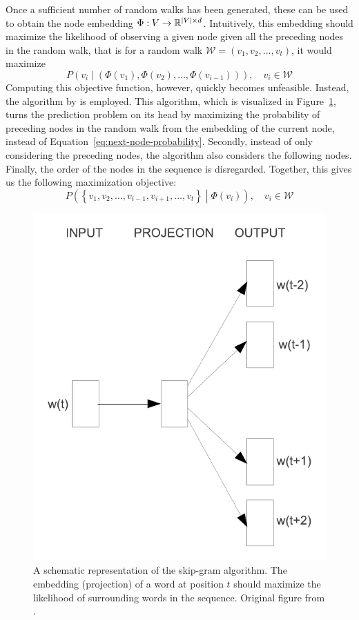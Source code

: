 Once a sufficient number of random walks has been generated, these can be used to obtain the node embedding \( \Phi : V \to \mathbb{R}^{\left\lvert V \right\rvert \times d} \). Intuitively, this embedding should maximize the likelihood of observing a given node given all the preceding nodes in the random walk, that is for a random walk \( \mathcal{W} = \left( v_1, v_2, \dots, v_t \right) \), it would maximize
\begin{equation}\label{eq:next-node-probability}
	P \left( v_i \middle| \left( \Phi \left( v_1 \right), \Phi \left( v_2 \right), \dots, \Phi \left( v_{i-1} \right) \right) \right), \quad v_i \in \mathcal{W}
\end{equation}
Computing this objective function, however, quickly becomes unfeasible. Instead, the  algorithm by \cite{mikolov_efficient_2013} is employed. This algorithm, which is visualized in Figure~\ref{fig:skip-gram}, turns the prediction problem on its head by maximizing the probability of preceding nodes in the random walk from the embedding of the current node, instead of Equation~\ref{eq:next-node-probability}. Secondly, instead of only considering the preceding nodes, the algorithm also considers the following nodes. Finally, the order of the nodes in the sequence is disregarded. Together, this gives us the following maximization objective:
\begin{equation}\label{eq:deepwalk-objective}
	P \left( \left\{ v_1, v_2 , \dots, v_{i-1}, v_{i+1}, \dots, v_t \right\} \middle| \Phi \left( v_i \right) \right), \quad v_i \in \mathcal{W}
\end{equation}

\begin{figure}
	\includegraphics[width=0.6\linewidth]{images/skip-gram.pdf}
	\caption{A schematic representation of the skip-gram algorithm. The embedding (projection) of a word at position \( t \) should maximize the likelihood of surrounding words in the sequence. Original figure from \cite{mikolov_efficient_2013}.}
	\label{fig:skip-gram}
\end{figure}

